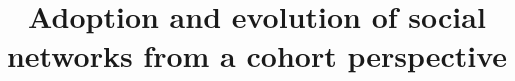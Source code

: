 \documentclass{sig-alternate}
\begin{document}
%

\title{Adoption and evolution of social networks from a cohort perspective}

%
%
%
%
%
\end{document}
